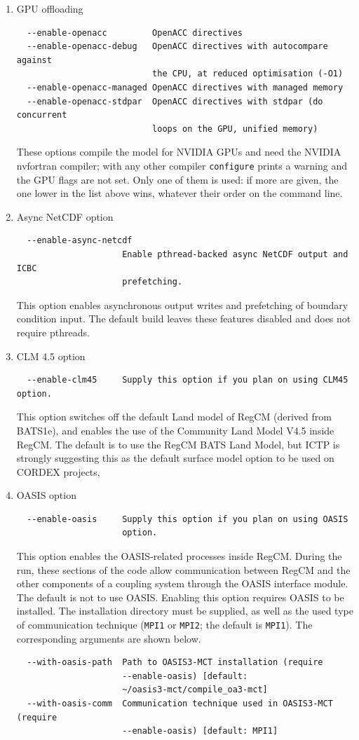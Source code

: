 \begin{enumerate}
\item GPU offloading
\begin{Verbatim}
  --enable-openacc         OpenACC directives
  --enable-openacc-debug   OpenACC directives with autocompare against
                           the CPU, at reduced optimisation (-O1)
  --enable-openacc-managed OpenACC directives with managed memory
  --enable-openacc-stdpar  OpenACC directives with stdpar (do concurrent
                           loops on the GPU, unified memory)
\end{Verbatim}
These options compile the model for NVIDIA GPUs and need the NVIDIA
nvfortran compiler; with any other compiler \verb=configure= prints a warning
and the GPU flags are not set. Only one of them is used: if more are given,
the one lower in the list above wins, whatever their order on the command
line.

\item Async NetCDF option
\begin{Verbatim}
  --enable-async-netcdf
                     Enable pthread-backed async NetCDF output and ICBC
                     prefetching.
\end{Verbatim}
This option enables asynchronous output writes and prefetching of boundary
condition input. The default build leaves these features disabled and does not
require pthreads.
\item CLM 4.5 option
\begin{Verbatim}
  --enable-clm45     Supply this option if you plan on using CLM45 option.
\end{Verbatim}
This option switches off the default Land model of RegCM (derived from BATS1e),
and enables the use of the Community Land Model V4.5 inside RegCM. The default
is to use the RegCM BATS Land Model, but ICTP is strongly suggesting this as
the default surface model option to be used on CORDEX projects,
\item OASIS option
\begin{verbatim}
  --enable-oasis     Supply this option if you plan on using OASIS
                     option.
\end{verbatim}
This option enables the OASIS-related processes inside RegCM. During the run,
these sections of the code allow communication between RegCM and the other
components of a coupling system through the OASIS interface module. The default
is not to use OASIS.
Enabling this option requires OASIS to be installed. The installation directory
must be supplied, as well as the used type of communication technique
(\verb=MPI1= or \verb=MPI2=; the default is \verb=MPI1=).
The corresponding arguments are shown below.
\begin{verbatim}
  --with-oasis-path  Path to OASIS3-MCT installation (require
                     --enable-oasis) [default:
                     ~/oasis3-mct/compile_oa3-mct]
  --with-oasis-comm  Communication technique used in OASIS3-MCT (require
                     --enable-oasis) [default: MPI1]
\end{verbatim}
\end{enumerate}

